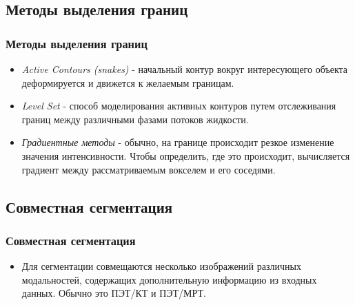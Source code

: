 \subsection{Методы выделения границ}
\begin{frame}
    \frametitle{Методы выделения границ}
    \begin{itemize}
        \item \textit{Active Contours (snakes)} - начальный контур 
        вокруг интересующего объекта деформируется и движется к желаемым границам.
        \item \textit{Level Set} - способ моделирования активных контуров путем отслеживания 
        границ между различными фазами потоков жидкости.
        \item \textit{Градиентные методы} - обычно, на границе происходит резкое изменение значения интенсивности. 
        Чтобы определить, где это происходит, вычисляется градиент между рассматриваемым вокселем и его соседями.
    \end{itemize}
\end{frame}

\subsection{Совместная сегментация}
\begin{frame}
    \frametitle{Совместная сегментация}
    \begin{itemize}
        \item Для сегментации совмещаются несколько изображений различных модальностей, 
        содержащих дополнительную информацию из входных данных. Обычно это ПЭТ/КТ и ПЭТ/МРТ.
    \end{itemize}
\end{frame}